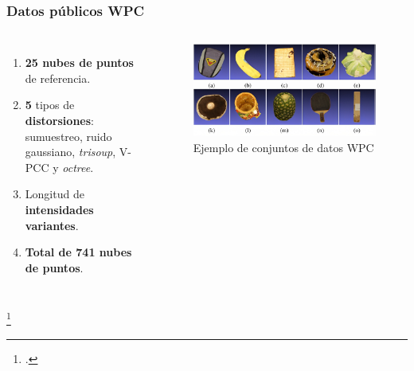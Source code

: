 \begin{frame}
    \frametitle{Datos públicos WPC}
    \begin{columns}
      \begin{enumerate}[<+->]
        \item \textbf{25 nubes de puntos} de referencia.  
        \item \textbf{5} tipos de \textbf{distorsiones}: 
          sumuestreo, ruido gaussiano, \emph{trisoup}, V-PCC y \emph{octree}.
        \item Longitud de \textbf{intensidades variantes}.
        \item \textbf{Total de 741 nubes de puntos}.
      \end{enumerate}
      \begin{figure}
        \includegraphics[width=.95\textwidth]{imagenes/chapter3/WPC}
        \caption{Ejemplo de conjuntos de datos WPC\footnotemark}
        \label{fig:WPC}
      \end{figure}
    \end{columns}
    \footcitetext{WPC1}
\end{frame}

